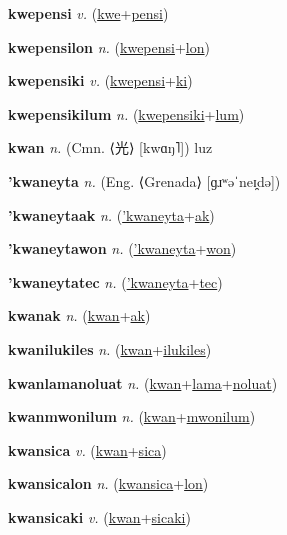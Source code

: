 \textbf{\hypertarget{kwepensi}{kwepensi}} \textit{v.} (\hyperlink{kwe}{kwe}+\allowbreak \hyperlink{pensi}{pensi})


\textbf{\hypertarget{kwepensilon}{kwepensilon}} \textit{n.} (\hyperlink{kwepensi}{kwepensi}+\allowbreak \hyperlink{lon}{lon})


\textbf{\hypertarget{kwepensiki}{kwepensiki}} \textit{v.} (\hyperlink{kwepensi}{kwepensi}+\allowbreak \hyperlink{ki}{ki})


\textbf{\hypertarget{kwepensikilum}{kwepensikilum}} \textit{n.} (\hyperlink{kwepensiki}{kwepensiki}+\allowbreak \hyperlink{lum}{lum})


\textbf{\hypertarget{kwan}{kwan}} \textit{n.} (Cmn. ⟨{\chinese{}光}⟩ [kwɑŋ˥])
luz

\textbf{\hypertarget{'kwaneyta}{'kwaneyta}} \textit{n.} (Eng. ⟨Grenada⟩ [ɡɹʷəˈneɪ̯də])


\textbf{\hypertarget{'kwaneytaak}{'kwaneytaak}} \textit{n.} (\hyperlink{'kwaneyta}{'kwaneyta}+\allowbreak \hyperlink{ak}{ak})


\textbf{\hypertarget{'kwaneytawon}{'kwaneytawon}} \textit{n.} (\hyperlink{'kwaneyta}{'kwaneyta}+\allowbreak \hyperlink{won}{won})


\textbf{\hypertarget{'kwaneytatec}{'kwaneytatec}} \textit{n.} (\hyperlink{'kwaneyta}{'kwaneyta}+\allowbreak \hyperlink{tec}{tec})


\textbf{\hypertarget{kwanak}{kwanak}} \textit{n.} (\hyperlink{kwan}{kwan}+\allowbreak \hyperlink{ak}{ak})


\textbf{\hypertarget{kwanilukiles}{kwanilukiles}} \textit{n.} (\hyperlink{kwan}{kwan}+\allowbreak \hyperlink{ilukiles}{ilukiles})


\textbf{\hypertarget{kwanlamanoluat}{kwanlamanoluat}} \textit{n.} (\hyperlink{kwan}{kwan}+\allowbreak \hyperlink{lama}{lama}+\allowbreak \hyperlink{noluat}{noluat})


\textbf{\hypertarget{kwanmwonilum}{kwanmwonilum}} \textit{n.} (\hyperlink{kwan}{kwan}+\allowbreak \hyperlink{mwonilum}{mwonilum})


\textbf{\hypertarget{kwansica}{kwansica}} \textit{v.} (\hyperlink{kwan}{kwan}+\allowbreak \hyperlink{sica}{sica})


\textbf{\hypertarget{kwansicalon}{kwansicalon}} \textit{n.} (\hyperlink{kwansica}{kwansica}+\allowbreak \hyperlink{lon}{lon})


\textbf{\hypertarget{kwansicaki}{kwansicaki}} \textit{v.} (\hyperlink{kwan}{kwan}+\allowbreak \hyperlink{sicaki}{sicaki})


